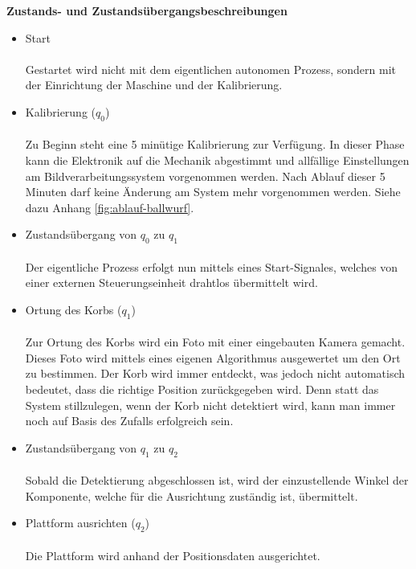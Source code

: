 \noindent
\textbf{Zustands- und Zustandsübergangsbeschreibungen}
\begin{itemize}
	
	\item Start \\ \\
	Gestartet wird nicht mit dem eigentlichen autonomen Prozess, sondern mit der Einrichtung der Maschine und der Kalibrierung.
	
	\item Kalibrierung ($q_{0}$) \\ \\
	Zu Beginn steht eine 5 minütige Kalibrierung zur Verfügung. In dieser Phase kann die Elektronik auf die Mechanik abgestimmt und allfällige Einstellungen am Bildverarbeitungssystem vorgenommen werden. Nach Ablauf dieser 5 Minuten darf keine Änderung am System mehr vorgenommen werden. Siehe dazu Anhang \ref{fig:ablauf-ballwurf}.
	
	\item Zustandsübergang von $q_{0}$ zu $q_{1}$ \\ \\
	Der eigentliche Prozess erfolgt nun mittels eines Start-Signales, welches von einer externen Steuerungseinheit drahtlos übermittelt wird.
	
	\item Ortung des Korbs ($q_{1}$) \\ \\
	Zur Ortung des Korbs wird ein Foto mit einer eingebauten Kamera gemacht. Dieses Foto wird mittels eines eigenen Algorithmus ausgewertet um den Ort zu bestimmen. Der Korb wird immer entdeckt, was jedoch nicht automatisch bedeutet, dass die richtige Position zurückgegeben wird. Denn statt das System stillzulegen, wenn der Korb nicht detektiert wird, kann man immer noch auf Basis des Zufalls erfolgreich sein.
	
	\newpage
	
	\item Zustandsübergang von $q_{1}$ zu $q_{2}$ \\ \\
	Sobald die Detektierung abgeschlossen ist, wird der einzustellende Winkel der Komponente, welche für die Ausrichtung zuständig ist, übermittelt.
	
	\item Plattform ausrichten ($q_{2}$) \\ \\
	Die Plattform wird anhand der Positionsdaten ausgerichtet.
	

\end{itemize}
